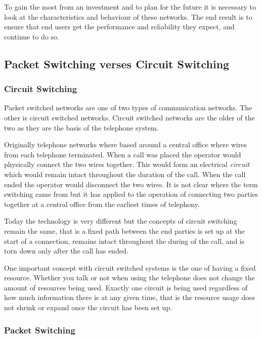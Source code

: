 To gain the most from an investment and to plan for the future it is
necessary to look at the characteristics and behaviour of these
networks.  The end result is to ensure that end users get the
performance and reliability they expect, and continue to do so.

\subsection{Packet Switching verses Circuit Switching}

\subsubsection{Circuit Switching}

Packet switched networks are one of two types of communication
networks.  The other is circuit switched networks.  Circuit switched
networks are the older of the two as they are the basis of the
telephone system.

Originally telephone networks where based around a central office
where wires from each telephone terminated.  When a call was placed
the operator would physically connect the two wires together.  This
would form an electrical {\em circuit} which would remain intact
throughout the duration of the call.  When the call ended the operator
would disconnect the two wires.  It is not clear where the term
switching came from but it has applied to the operation of connecting
two parties together at a central office from the earliest times of
telephony.

Today the technology is very different but the concepts of circuit
switching remain the same, that is a fixed path between the end
parties is set up at the start of a connection, remains intact
throughout the during of the call, and is torn down only after the
call has ended.

One important concept with circuit switched systems is the one of
having a fixed resource.  Whether you talk or not when using the
telephone does not change the amount of resources being used.  Exactly
one circuit is being used regardless of how much information there is
at any given time, that is the resource usage does not shrink or
expand once the circuit has been set up.

\subsubsection{Packet Switching}

